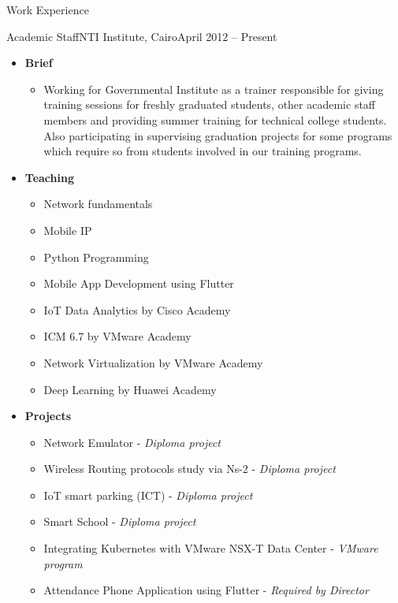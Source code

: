 \documentclass[]{mcdowellcv}
\begin{document}
	\begin{cvsection}{Work Experience}
		\begin{cvsubsection}{Academic Staff}{NTI Institute, Cairo}{April 2012 – Present}
			\begin{itemize}
				\item \textbf{Brief}
				\begin{itemize}
					\item Working for Governmental Institute as a trainer responsible for giving training sessions for freshly graduated students, other academic staff members and providing summer training for technical college students. Also participating in supervising graduation projects for some programs which require so from students involved in our training programs.
				\end{itemize}
			\end{itemize}
			\begin{itemize}
				\item \textbf{Teaching}
				\begin{itemize}
					\item Network fundamentals
					\item Mobile IP
					\item Python Programming
					\item Mobile App Development using Flutter
					\item IoT Data Analytics by Cisco Academy
					\item ICM 6.7 by VMware Academy
					\item Network Virtualization by VMware Academy
					\item Deep Learning by Huawei Academy
				\end{itemize}
				\item \textbf{Projects}
				\begin{itemize}
					\item Network Emulator - \textit{Diploma project}
					\item Wireless Routing protocols study via Ns-2 - \textit{Diploma project}
					\item IoT smart parking (ICT) - \textit{Diploma project}
					\item Smart School - \textit{Diploma project}
					\item Integrating Kubernetes with VMware NSX-T Data Center - \textit{VMware program}
					\item Attendance Phone Application using Flutter - \textit{Required by Director}
				\end{itemize}
			\end{itemize}
			
		\end{cvsubsection}
		
	\end{cvsection}
	
\end{document}
